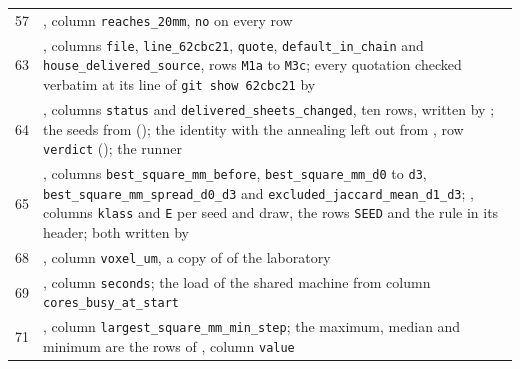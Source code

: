 \begin{xltabular}{\textwidth}{rX}
57 & \protect{}, column \texttt{reaches\_\allowbreak{}\allowbreak{}20mm}, \texttt{no} on every row \\
63 & \protect{}, columns \texttt{file}, \texttt{line\_\allowbreak{}62cbc21}, \texttt{quote}, \texttt{default\_\allowbreak{}in\_\allowbreak{}chain} and \texttt{house\_\allowbreak{}delivered\_\allowbreak{}source}, rows \texttt{M1a} to \texttt{M3c}; every quotation checked verbatim at its line of \texttt{git show 62cbc21} by \protect{} \\
64 & \protect{}, columns \texttt{status} and \texttt{delivered\_\allowbreak{}sheets\_\allowbreak{}changed}, ten rows, written by \protect{}; the seeds from \protect{} (\protect{}); the identity with the annealing left out from \protect{}, row \texttt{verdict} (\protect{}); the runner \protect{} \\
65 & \protect{}, columns \texttt{best\_\allowbreak{}square\_\allowbreak{}mm\_\allowbreak{}before}, \texttt{best\_\allowbreak{}square\_\allowbreak{}mm\_\allowbreak{}d0} to \texttt{d3}, \texttt{best\_\allowbreak{}square\_\allowbreak{}mm\_\allowbreak{}spread\_\allowbreak{}d0\_\allowbreak{}d3} and \texttt{excluded\_\allowbreak{}jaccard\_\allowbreak{}mean\_\allowbreak{}d1\_\allowbreak{}d3}; \protect{}, columns \texttt{klass} and \texttt{E} per seed and draw, the rows \texttt{SEED} and the rule in its header; both written by \protect{} \\
68 & \protect{}, column \texttt{voxel\_\allowbreak{}um}, a copy of \protect{} of the laboratory \\
69 & \protect{}, column \texttt{seconds}; the load of the shared machine from column \texttt{cores\_\allowbreak{}busy\_\allowbreak{}at\_\allowbreak{}start} \\
71 & \protect{}, column \texttt{largest\_\allowbreak{}square\_\allowbreak{}mm\_\allowbreak{}min\_\allowbreak{}step}; the maximum, median and minimum are the rows of \protect{}, column \texttt{value} \\

\end{xltabular}

